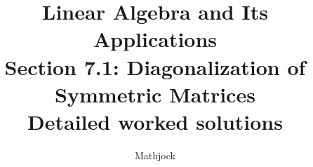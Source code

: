 
\title{\textbf{Linear Algebra and Its Applications}\\[0.3em]Section 7.1: Diagonalization of Symmetric Matrices\\[0.3em]\large Detailed worked solutions}
\author{Mathjock}
\date{}

\maketitle
\bookinfo
\tableofcontents
\clearpage
\renewcommand{\thesection}{7.\arabic{section}}
\renewcommand{\theHsection}{7.\arabic{section}}
\setcounter{section}{0}


